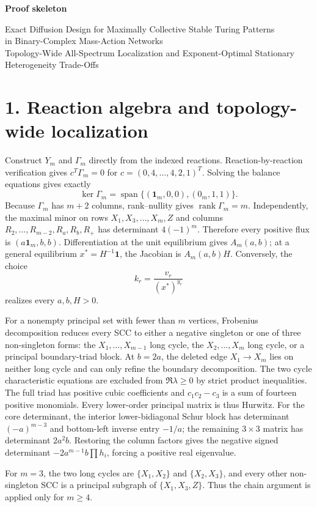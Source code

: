 \documentclass[10pt]{article}
\begin{document}
\begin{center}
{\Large\bf Proof skeleton}\par
{\large Exact Diffusion Design for Maximally Collective Stable Turing Patterns}\\
{\normalsize in Binary-Complex Mass-Action Networks}\\
{\small Topology-Wide All-Spectrum Localization and
Exponent-Optimal Stationary Heterogeneity Trade-Offs}
\end{center}

\section*{1. Reaction algebra and topology-wide localization}
Construct $Y_m$ and $\Gamma_m$ directly from the indexed reactions.
Reaction-by-reaction verification gives $c^T\Gamma_m=0$ for
$c=(0,4,\ldots,4,2,1)^T$.  Solving the balance equations gives exactly
\[
\ker\Gamma_m=\operatorname{span}\{(\mathbf1_m,0,0),(0_m,1,1)\}.
\]
Because $\Gamma_m$ has $m+2$ columns, rank--nullity gives
$\operatorname{rank}\Gamma_m=m$.  Independently, the maximal minor on rows
$X_1,X_3,\ldots,X_m,Z$ and columns
$R_2,\ldots,R_{m-2},R_a,R_b,R_+$ has determinant $4(-1)^m$.
Therefore every positive flux is $(a\mathbf1_m,b,b)$.  Differentiation at the
unit equilibrium gives $A_m(a,b)$; at a general equilibrium
$x^*=H^{-1}\mathbf1$, the Jacobian is $A_m(a,b)H$.  Conversely, the choice
\[
 k_r=\frac{v_r}{(x^*)^{y_r}}
\]
realizes every $a,b,H>0$.

For a nonempty principal set with fewer than $m$ vertices, Frobenius decomposition reduces every SCC to either a negative singleton or one of three non-singleton forms: the $X_1,\ldots,X_{m-1}$ long cycle, the $X_2,\ldots,X_m$ long cycle, or a principal boundary-triad block. At $b=2a$, the deleted edge $X_1\to X_m$ lies on neither long cycle and can only refine the boundary decomposition. The two cycle characteristic equations are excluded from $\Re\lambda\ge0$ by strict product inequalities. The full triad has positive cubic coefficients and $c_1c_2-c_3$ is a sum of fourteen positive monomials. Every lower-order principal matrix is thus Hurwitz. For the core determinant, the interior lower-bidiagonal Schur block has determinant $(-a)^{m-3}$ and bottom-left inverse entry $-1/a$; the remaining $3\times3$ matrix has determinant $2a^2b$. Restoring the column factors gives the negative signed determinant $-2a^{m-1}b\prod h_i$, forcing a positive real eigenvalue.

For $m=3$, the two long cycles are $\{X_1,X_2\}$ and $\{X_2,X_3\}$,
and every other non-singleton SCC is a principal subgraph of
$\{X_1,X_3,Z\}$.  Thus the chain argument is applied only for $m\ge4$.
\end{document}
